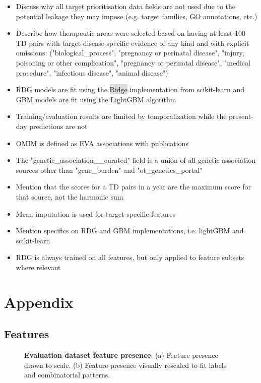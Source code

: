 \documentclass{article}
\begin{document}
\begin{itemize}
  \item Discuss why all target prioritisation data fields are not used due to the potential leakage they may impose (e.g. target families, GO annotations, etc.)
  \item Describe how therapeutic areas were selected based on having at least 100 TD pairs with target-disease-specific evidence of any kind and with explicit omissions: ("biological\_process", "pregnancy or perinatal disease", "injury, poisoning or other complication", "pregnancy or perinatal disease", "medical procedure", "infectious disease", "animal disease")
  \item RDG models are fit using the \colorbox{Gainsboro}{Ridge} implementation from scikit-learn and GBM models are fit using the LightGBM \cite{LightGBM} algorithm
  \item Training/evaluation results are limited by temporalization while the present-day predictions are not
  \item OMIM is defined as EVA associations with publications
  \item The "genetic\_association\_\_curated" field is a union of all genetic association sources other than "gene\_burden" and "ot\_genetics\_portal"
  \item Mention that the scores for a TD pairs in a year are the maximum score for that source, not the harmonic sum
  \item Mean imputation is used for target-specific features
  \item Mention specifics on RDG and GBM implementations, i.e. lightGBM and scikit-learn
  \item RDG is always trained on all features, but only applied to feature subsets where relevant
\end{itemize} 

\section{Appendix}

\subsection{Features}



\begin{figure}[H]
  \centering
  \captionsetup{width=.9\linewidth}
  \captionsetup[subfigure]{labelformat=empty}
  \qquad
  \caption{
    \textbf{Evaluation dataset feature presence}.
    (a) Feature presence drawn to scale. 
    (b) Feature presence visually rescaled to fit labels and combinatorial patterns. 
  }
  \label{fig:feature_presence}
\end{figure}
\end{document}

